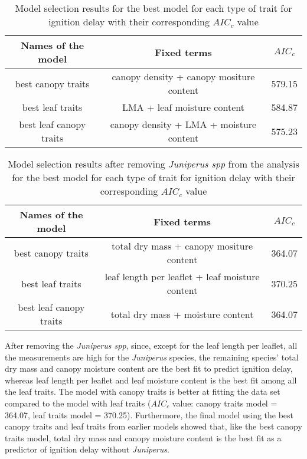 \documentclass[12pt]{report}
\begin{document}
\begin{table}
\centering
\begin{tabular}{|c | c | c|}
       \hline
       \textbf{Names of the model} & \textbf{Fixed terms} & \textbf{$AIC_{c}$} \\
       \hline
       best canopy traits  & canopy density + canopy mositure content & 579.15 \\
       \hline
       best leaf traits    & LMA + leaf moisture content & 584.87 \\
       \hline
       best leaf canopy traits   & canopy density + LMA + moisture content & 575.23\\
       \hline
\end{tabular}
\caption{Model selection results for the best model for each type of trait for ignition delay with their corresponding $AIC_{c}$ value}
\end{table} 


\begin{table}
\centering
\begin{tabular}{|c | c | c|}
      \hline
      \textbf{Names of the model} & \textbf{Fixed terms} & \textbf{$AIC_{c}$} \\
       \hline
       best canopy traits  & total dry mass + canopy mositure content & 364.07 \\
       \hline
       best leaf traits    & leaf length per leaflet + leaf moisture content & 370.25 \\
       \hline
       best leaf canopy traits   & total dry mass + moisture content & 364.07\\
       \hline
\end{tabular}
\caption{Model selection results after removing \emph{Juniperus spp} from the  analysis  for the best model for each type of trait for ignition delay with their corresponding $AIC_{c}$ value}
\end{table} 


After removing the \emph{Juniperus spp}, since, except for the leaf length per leaflet, all the measurements are high for the \emph{Juniperus} species, the remaining species' total dry mass and canopy moisture content are the best fit to predict ignition delay, whereas leaf length per leaflet and leaf moisture content is the best fit among all the leaf traits. The model with canopy traits is better at fitting the data set compared to the model with leaf traits ($AIC_{c}$ value: canopy traits model = 364.07, leaf traits model = 370.25).  Furthermore, the final model using the best canopy traits and leaf traits from earlier models showed that, like the best canopy traits model, total dry mass and canopy moisture content is the best fit as a predictor of ignition delay without \emph{Juniperus}. \\
\end{document}
